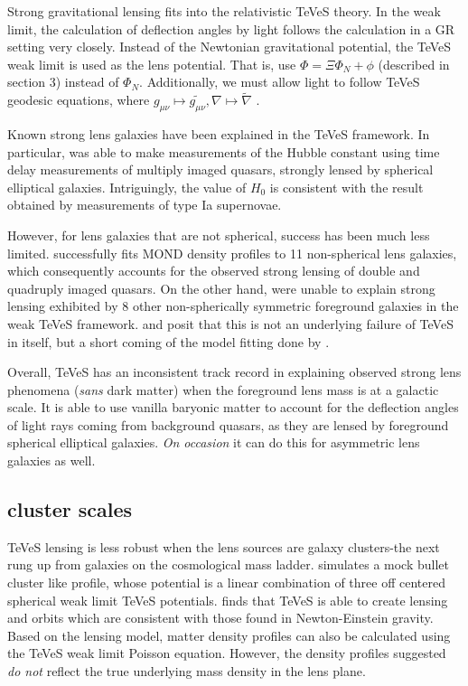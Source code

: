\documentclass[12pt]{article}
\begin{document}
Strong gravitational lensing fits into the relativistic TeVeS theory. In the weak limit, the calculation of deflection angles by light follows the calculation in a GR setting very closely. Instead of the Newtonian gravitational potential, the TeVeS weak limit is used as the lens potential. That is, use $\Phi = \Xi \Phi_{N} + \phi$ (described in section 3) instead of $\Phi_{N}$. Additionally, we must allow light to follow TeVeS geodesic equations, where $g_{\mu \nu} \mapsto \tilde{g_{\mu \nu}}, \nabla \mapsto \tilde{\nabla}$ \cite{Famaey2012}. 

Known strong lens galaxies have been explained in the TeVeS framework. In particular, \cite{Tian2013} was able to make measurements of the Hubble constant using time delay measurements of multiply imaged quasars, strongly lensed by spherical elliptical galaxies. Intriguingly, the value of $H_{0}$ is consistent with the result obtained by measurements of type Ia supernovae. 

However, for lens galaxies that are not spherical, success has been much less limited. \cite{Shan2008} successfully fits MOND density profiles to 11 non-spherical lens galaxies, which consequently accounts for the observed strong lensing of double and quadruply imaged quasars. On the other hand, \cite{Shan2008} were unable to explain strong lensing exhibited by 8 other non-spherically symmetric foreground galaxies in the weak TeVeS framework. \cite{Shan2008} and \cite{Famaey2012} posit that this is not an underlying failure of TeVeS in itself, but a short coming of the model fitting done by \cite{Shan2008}.

Overall, TeVeS has an inconsistent track record in explaining observed strong lens phenomena (\emph{sans} dark matter) when the foreground lens mass is at a galactic scale. It is able to use vanilla baryonic matter to account for the deflection angles of light rays coming from background quasars, as they are lensed by foreground spherical elliptical galaxies. \emph{On occasion} it can do this for asymmetric lens galaxies as well.

\subsection{cluster scales}
TeVeS lensing is less robust when the lens sources are galaxy clusters-the next rung up from galaxies on the cosmological mass ladder. \cite{Angus2006} simulates a mock bullet cluster like profile, whose potential is a linear combination of three off centered spherical weak limit TeVeS potentials. \cite{Angus2006} finds that TeVeS is able to create lensing and orbits which are consistent with those found in Newton-Einstein gravity. Based on the lensing model, matter density profiles can also be calculated using the TeVeS weak limit Poisson equation. However, the density profiles suggested \emph{do not} reflect the true underlying mass density in the lens plane. 
\end{document}
